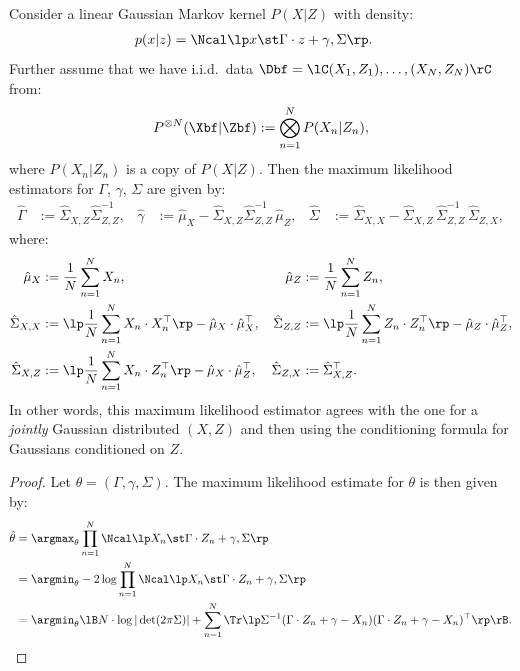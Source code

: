 \begin{Lem}
    \label{lem:mle-lin-gauss}
    Consider a linear Gaussian Markov kernel $P(X|Z)$ with density:
    \begin{align*}
        p(x|z) &=\Ncal\lp x \st \Gamma \cdot z + \gamma, \Sigma \rp.
    \end{align*}
    Further assume that we have i.i.d.\ data 
    $\Dbf=\lC (X_1,Z_1),\dots,(X_N,Z_N) \rC$ from: 
    \[ P^{\otimes N}(\Xbf|\Zbf) := \bigotimes_{n=1}^N P(X_n|Z_n),  \]
    where $P(X_n|Z_n)$ is a copy of $P(X|Z)$.
    Then the maximum likelihood estimators for $\Gamma$, $\gamma$, $\Sigma$ are given by:
    \begin{align*}
        \hat \Gamma &:= \hat \Sigma_{X,Z} \hat \Sigma_{Z,Z}^{-1}, &
        \hat \gamma &:= \hat \mu_X -  \hat \Sigma_{X,Z} \hat \Sigma_{Z,Z}^{-1}\, \hat \mu_Z, &
        \hat \Sigma &:= \hat\Sigma_{X,X} -\hat\Sigma_{X,Z}\,\hat\Sigma_{Z,Z}^{-1}\,\hat\Sigma_{Z,X},
    \end{align*}
  where:
      \begin{align*}
       \hat \mu_X &:= \frac{1}{N} \sum_{n=1}^N X_n, &
       \hat \mu_Z &:= \frac{1}{N} \sum_{n=1}^N Z_n, \\
       \hat \Sigma_{X,X} &:= \lp \frac{1}{N} \sum_{n=1}^N X_n \cdot X_n^\top \rp - \hat \mu_X \cdot \hat \mu_X^\top, &
        \hat \Sigma_{Z,Z} &:= \lp \frac{1}{N} \sum_{n=1}^N Z_n \cdot Z_n^\top \rp - \hat \mu_Z \cdot \hat \mu_Z^\top,\\
        \hat \Sigma_{X,Z} &:= \lp \frac{1}{N} \sum_{n=1}^N X_n \cdot Z_n^\top \rp - \hat \mu_X \cdot \hat \mu_Z^\top, &
        \hat \Sigma_{Z,X} &:= \hat \Sigma_{X,Z}^\top.
    \end{align*}
    In other words, this maximum likelihood estimator agrees with the one for a \emph{jointly} Gaussian distributed $(X,Z)$
    and then using the conditioning formula for Gaussians conditioned on $Z$. %
    \begin{proof}
        Let $\theta=(\Gamma,\gamma,\Sigma)$. The maximum likelihood estimate for $\theta$ is then given by:
    \begin{align*}
        \hat \theta & =\argmax_{\theta} \prod_{n=1}^N \Ncal\lp X_n \st \Gamma \cdot Z_n + \gamma, \Sigma \rp \\
        &= \argmin_{\theta} - 2 \log  \prod_{n=1}^N \Ncal\lp X_n \st \Gamma \cdot Z_n + \gamma, \Sigma \rp \\
        &= \argmin_{\theta} \lB N \cdot \log |\det(2\pi\Sigma)| + \sum_{n=1}^N \Tr\lp \Sigma^{-1}(\Gamma \cdot Z_n + \gamma - X_n)(\Gamma \cdot Z_n + \gamma - X_n)^\top \rp \rB.

\end{align*}
\end{proof}
\end{Lem}
